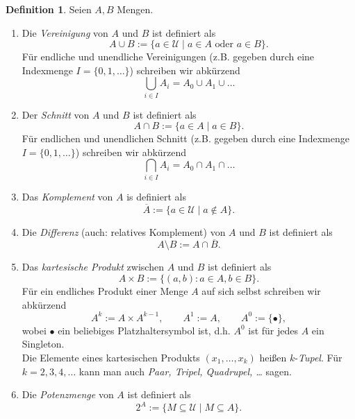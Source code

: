 \documentclass[11pt, a4paper]{article}
\theoremstyle{definition}
\newtheorem{definition}{Definition}[section]
\theoremstyle{plain}
\numberwithin{equation}{section}
\newcommand{\comp}[1]{\overline{#1}}
\begin{document}
\begin{definition}\label{def:setops}
	Seien \( A, B \) Mengen. 
	\begin{enumerate}[label=(\alph*)]
		\item Die \textit{Vereinigung} von \( A \) und \( B \) ist definiert als 
			\[ 
				A \cup B := \{ a \in \mathcal{U} \mid a \in A \text{ oder } a \in B \}.
			\]
			Für endliche und unendliche Vereinigungen (z.B. gegeben durch eine Indexmenge \( I = \{ 0, 1, \ldots \} \)) schreiben wir abkürzend
			\[
				\bigcup_{i \in I} A_i = A_0 \cup A_1 \cup \ldots
			\]
		\item Der \textit{Schnitt} von \( A \) und \( B \) ist definiert als
			\[
				A \cap B := \{ a \in A \mid a \in B \}.
			\]
			Für endlichen und unendlichen Schnitt (z.B. gegeben durch eine Indexmenge \( I = \{ 0, 1, \ldots \} \)) schreiben wir abkürzend
			\[
				\bigcap_{i \in I} A_i = A_0 \cap A_1 \cap \ldots
			\]
		\item Das \textit{Komplement} von \( A \) is definiert als
			\[
				\comp{A} := \{ a \in \mathcal{U} \mid a \notin A \}.
			\]
		\item Die \textit{Differenz} (auch: relatives Komplement) von \( A \) und \( B \) ist definiert als
			\[
				A \setminus B := A \cap \comp{B}.
			\]
		\item Das \textit{kartesische Produkt} zwischen \( A \) und \( B \) ist definiert als
			\[
				A \times B := \{(a, b) : a \in A, b \in B \}.
			\]
			Für ein endliches Produkt einer Menge \( A \) auf sich selbst schreiben wir abkürzend
			\[
				A^k := A \times A^{k-1}, \quad\quad A^1 := A, \quad\quad A^0 := \{ \bullet \},
			\]
			wobei \( \bullet \) ein beliebiges Platzhaltersymbol ist, d.h. \( A^0 \) ist für jedes \( A \) ein Singleton.\\
			Die Elemente eines kartesischen Produkts \( (x_1, \ldots, x_k) \) heißen \( k\)-\textit{Tupel}. Für \( k = 2, 3, 4, \ldots \) kann man auch \textit{Paar, Tripel, Quadrupel, \ldots} sagen.
		\item Die \textit{Potenzmenge} von \( A \) ist definiert als
			\[
				2^A := \{ M \subseteq \mathcal{U} \mid M \subseteq A \}.
			\]
	\end{enumerate}
\end{definition}
\end{document}
